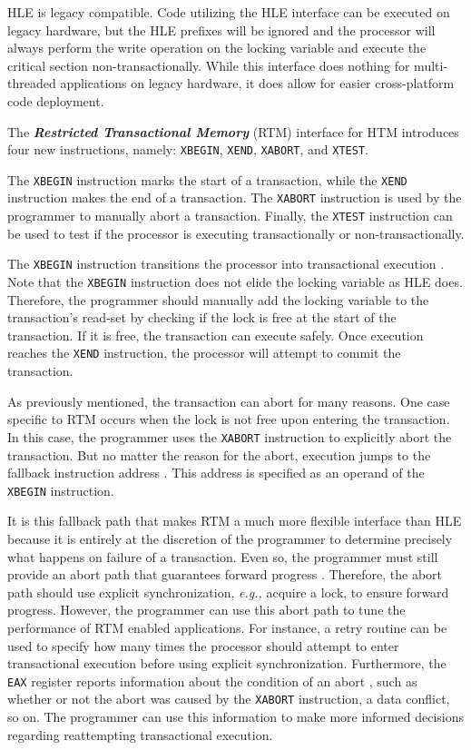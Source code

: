 \documentclass{sig-alternate}
\begin{document}
HLE is legacy compatible.  Code utilizing the HLE interface can be executed on legacy
hardware, but the HLE prefixes will be ignored \cite{intel_prog_ref} and the processor
will always perform the write operation on the locking variable and execute the critical
section non-transactionally.  While this interface does nothing for multi-threaded
applications on legacy hardware, it does allow for easier cross-platform code deployment.

The \emph{\textbf{Restricted Transactional Memory}} (RTM) interface for HTM introduces
four new instructions, namely: \texttt{XBEGIN}, \texttt{XEND}, \texttt{XABORT}, and
\texttt{XTEST}.

The \texttt{XBEGIN} instruction marks the start of a transaction, while the \texttt{XEND}
instruction makes the end of a transaction.  The \texttt{XABORT} instruction is used by
the programmer to manually abort a transaction.  Finally, the \texttt{XTEST} instruction
can be used to test if the processor is executing transactionally or non-transactionally.

The \texttt{XBEGIN} instruction transitions the processor into transactional execution
\cite{intel_prog_ref}.  Note that the \texttt{XBEGIN} instruction does not elide the
locking variable as HLE does.  Therefore, the programmer should manually add the locking
variable to the transaction's read-set by checking if the lock is free at the start of the
transaction.  If it is free, the transaction can execute safely.  Once execution reaches
the \texttt{XEND} instruction, the processor will attempt to commit the transaction.

As previously mentioned, the transaction can abort for many reasons.  One case specific to
RTM occurs when the lock is not free upon entering the transaction.  In this case, the
programmer uses the \texttt{XABORT} instruction to explicitly abort the transaction.  But
no matter the reason for the abort, execution jumps to the fallback instruction address
\cite{intel_prog_ref}.  This address is specified as an operand of the \texttt{XBEGIN}
instruction.

It is this fallback path that makes RTM a much more flexible interface than HLE because it
is entirely at the discretion of the programmer to determine precisely what happens on
failure of a transaction.  Even so, the programmer must still provide an abort path that
guarantees forward progress \cite{intel_prog_ref}.  Therefore, the abort path should use
explicit synchronization, \emph{e.g.,} acquire a lock, to ensure forward progress.
However, the programmer can use this abort path to tune the performance of RTM enabled
applications.  For instance, a retry routine can be used to specify how many times the
processor should attempt to enter transactional execution before using explicit
synchronization.  Furthermore, the \texttt{EAX} register reports information about the
condition of an abort \cite{intel_prog_ref}, such as whether or not the abort was caused
by the \texttt{XABORT} instruction, a data conflict,  so on.  The programmer can use
this information to make more informed decisions regarding reattempting transactional
execution.
\end{document}
